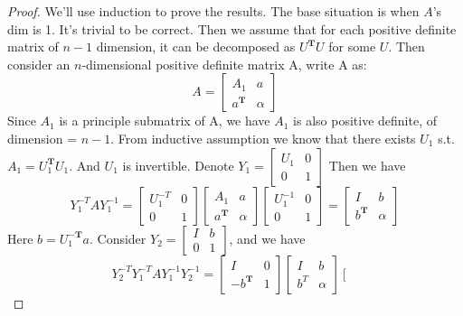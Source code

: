 \documentclass[twoside,11pt]{homework}
\begin{document}
\begin{proof}

We'll use induction to prove the results. The base situation is when $A$'s dim is 1. It's trivial to be correct.
Then we assume that for each positive definite matrix of $n-1$ dimension, it can be decomposed as $U^\mathbf{T}U$ for some $U$.
Then consider an $n$-dimensional positive definite matrix A, write A as:
$$A=
 \left[
 \begin{matrix}
   A_1 & a \\
   a^\mathbf{T} & \alpha
  \end{matrix}
  \right]
$$
Since $A_1$ is a principle submatrix of A, we have $A_1$ is also positive definite, of dimension = $n-1$. From inductive assumption we know that there exists $U_1$ s.t. $A_1 = U_1^\mathbf{T}U_1$. And $U_1$ is invertible.
Denote $Y_1 = \left[
 \begin{matrix}
   U_1 & 0 \\
   0 & 1
  \end{matrix}
  \right]$ Then we have
$$
Y_1^{-T}AY_1^{-1}= 
\left[
 \begin{matrix}
   U_1^{-T} & 0 \\
   0 & 1
  \end{matrix}
\right]
\left[
 \begin{matrix}
   A_1 & a \\
   a^\mathbf{T} & \alpha
  \end{matrix}
\right]
\left[
 \begin{matrix}
   U_1^{-1} & 0 \\
   0 & 1
  \end{matrix}
\right]
= 
\left[
 \begin{matrix}
   I & b \\
   b^\mathbf{T} & \alpha
  \end{matrix}
\right]
$$
Here $b = U_1^{-\mathbf{T}}a$.
Consider $Y_2 = 
\left[
 \begin{matrix}
   I & b \\
   0 & 1
  \end{matrix}
\right]$, and we have
$$
Y_2^{-T}Y_1^{-T}AY_1^{-1}Y_2^{-1} = 
\left[
 \begin{matrix}
   I & 0 \\
   -b^\mathbf{T} & 1
  \end{matrix}
\right]
\left[
 \begin{matrix}
   I & b \\
   b^T & \alpha
  \end{matrix}
\right]
\left[
 \begin{matrix}

\end{matrix}$$
\end{proof}
\end{document}
